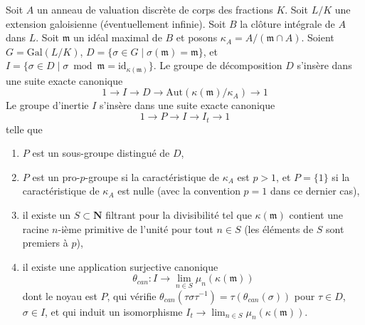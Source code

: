 \begin{lemma}
\label{lemma-structure-decomposition}
Soit $A$ un anneau de valuation discrète de corps des fractions $K$.
Soit $L/K$ une extension galoisienne (éventuellement infinie).
Soit $B$ la clôture intégrale de $A$ dans $L$.
Soit $\mathfrak m$ un idéal maximal de $B$ et posons $\kappa_A = A/(\mathfrak m \cap A)$.
Soient $G = \text{Gal}(L/K)$,
$D = \{\sigma \in G \mid \sigma(\mathfrak m) = \mathfrak m\}$, et
$I = \{\sigma \in D \mid \sigma \bmod \mathfrak m =
\text{id}_{\kappa(\mathfrak m)}\}$.
Le groupe de décomposition $D$ s'insère dans une suite exacte canonique
$$
1 \to I \to D \to \text{Aut}(\kappa(\mathfrak m)/\kappa_A) \to 1
$$
Le groupe d'inertie $I$ s'insère dans une suite exacte canonique
$$
1 \to P \to I \to I_t \to 1
$$
telle que
\begin{enumerate}
\item $P$ est un sous-groupe distingué de $D$,
\item $P$ est un pro-$p$-groupe si la caractéristique de
$\kappa_A$ est $p > 1$, et $P = \{1\}$ si la caractéristique de $\kappa_A$
est nulle (avec la convention $p = 1$ dans ce dernier cas),
\item il existe un $S \subset \mathbf{N}$ filtrant pour la divisibilité
tel que $\kappa(\mathfrak m)$ contient une racine $n$-ième primitive de l'unité
pour tout $n \in S$ (les éléments de $S$ sont premiers à $p$),
\item il existe une application surjective canonique
$$
\theta_{can} : I \to \lim_{n \in S} \mu_n(\kappa(\mathfrak m))
$$
dont le noyau est $P$, qui vérifie
$\theta_{can}(\tau \sigma \tau^{-1}) = \tau(\theta_{can}(\sigma))$
pour $\tau \in D$, $\sigma \in I$, et qui induit un isomorphisme
$I_t \to \lim_{n \in S} \mu_n(\kappa(\mathfrak m))$.
\end{enumerate}
\end{lemma}


